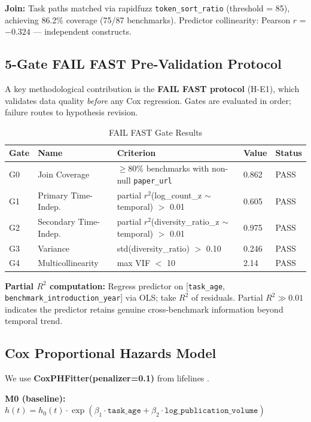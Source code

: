 \textbf{Join:} Task paths matched via rapidfuzz \texttt{token\_sort\_ratio} (threshold = 85), achieving 86.2\% coverage (75/87 benchmarks). Predictor collinearity: Pearson $r$ = $-0.324$ --- independent constructs.

\subsection{5-Gate FAIL FAST Pre-Validation Protocol}
\label{sec:failfast}

A key methodological contribution is the \textbf{FAIL FAST protocol} (H-E1), which validates data quality \emph{before} any Cox regression. Gates are evaluated in order; failure routes to hypothesis revision.

\begin{table}[h]
\centering
\caption{FAIL FAST Gate Results}
\label{tab:gates}
\begin{tabular}{@{}lllll@{}}
\toprule
Gate & Name & Criterion & Value & Status \\
\midrule
G0 & Join Coverage & $\geq$80\% benchmarks with non-null \texttt{paper\_url} & 0.862 & PASS \\
G1 & Primary Time-Indep. & partial $r^{2}$(log\_count\_z $\sim$ temporal) $>$ 0.01 & 0.605 & PASS \\
G2 & Secondary Time-Indep. & partial $r^{2}$(diversity\_ratio\_z $\sim$ temporal) $>$ 0.01 & 0.975 & PASS \\
G3 & Variance & std(diversity\_ratio) $>$ 0.10 & 0.246 & PASS \\
G4 & Multicollinearity & max VIF $<$ 10 & 2.14 & PASS \\
\bottomrule
\end{tabular}
\end{table}

\textbf{Partial $R^{2}$ computation:} Regress predictor on [\texttt{task\_age}, \texttt{benchmark\_introduction\_year}] via OLS; take $R^{2}$ of residuals. Partial $R^{2} \gg 0.01$ indicates the predictor retains genuine cross-benchmark information beyond temporal trend.

\subsection{Cox Proportional Hazards Model}

We use \textbf{CoxPHFitter(penalizer=0.1)} from lifelines \cite{davidson2019lifelines}.

\textbf{M0 (baseline):} $h(t) = h_{0}(t) \cdot \exp(\beta_{1}\cdot\texttt{task\_age} + \beta_{2}\cdot\texttt{log\_publication\_volume})$

